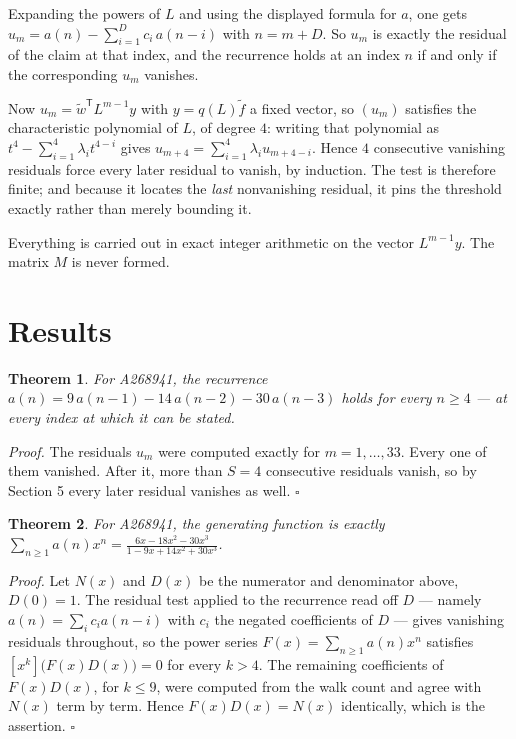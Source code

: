 \documentclass[11pt]{article}
\newtheorem{theorem}{Theorem}
\theoremstyle{definition}
\begin{document}
Expanding the powers of $L$ and using the displayed formula for $a$, one gets $u_m = a(n) - \sum_{i=1}^{D} c_i\,a(n-i)$ with $n = m + D$. So $u_m$ is exactly the residual of the claim at that index, and the recurrence holds at an index $n$ if and only if the corresponding $u_m$ vanishes.

Now $u_m = \tilde w^{\mathsf T} L^{m-1} y$ with $y = q(L)\tilde f$ a fixed vector, so $(u_m)$ satisfies the characteristic polynomial of $L$, of degree $4$: writing that polynomial as $t^{4} - \sum_{i=1}^{4} \lambda_i t^{4-i}$ gives $u_{m+4} = \sum_{i=1}^{4} \lambda_i u_{m+4-i}$. Hence $4$ consecutive vanishing residuals force every later residual to vanish, by induction. The test is therefore finite; and because it locates the {\itshape last} nonvanishing residual, it pins the threshold exactly rather than merely bounding it.

Everything is carried out in exact integer arithmetic on the vector $L^{m-1}y$. The matrix $M$ is never formed.

\section{Results}

\begin{theorem} For A268941, the recurrence $a(n) = 9\,a(n-1) - 14\,a(n-2) - 30\,a(n-3)$ holds for every $n \ge 4$ --- at every index at which it can be stated.\end{theorem}

{\itshape Proof.} The residuals $u_m$ were computed exactly for $m = 1,\dots,33$. Every one of them vanished. After it, more than $S = 4$ consecutive residuals vanish, so by Section 5 every later residual vanishes as well. $\square$

\begin{theorem} For A268941, the generating function is exactly $\sum_{n\ge 1} a(n)x^n = \frac{6x - 18x^{2} - 30x^{3}}{1 - 9x + 14x^{2} + 30x^{3}}$.\end{theorem}

{\itshape Proof.} Let $N(x)$ and $D(x)$ be the numerator and denominator above, $D(0)=1$. The residual test applied to the recurrence read off $D$ --- namely $a(n) = \sum_i c_i a(n-i)$ with $c_i$ the negated coefficients of $D$ --- gives vanishing residuals throughout, so the power series $F(x)=\sum_{n\ge 1}a(n)x^n$ satisfies $[x^k]\bigl(F(x)D(x)\bigr) = 0$ for every $k > 4$. The remaining coefficients of $F(x)D(x)$, for $k \le 9$, were computed from the walk count and agree with $N(x)$ term by term. Hence $F(x)D(x) = N(x)$ identically, which is the assertion. $\square$
\end{document}
